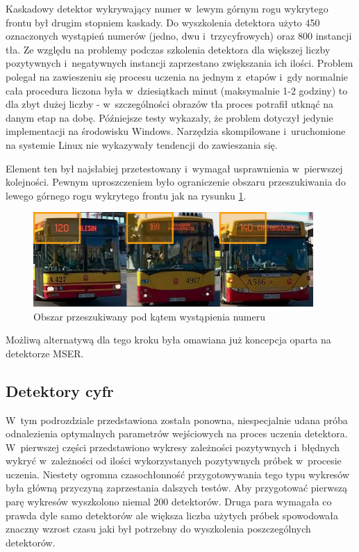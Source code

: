 Kaskadowy detektor wykrywający numer w~lewym górnym rogu wykrytego
frontu był drugim stopniem kaskady. Do wyszkolenia
detektora użyto 450 oznaczonych wystąpień numerów (jedno, dwu
i~trzycyfrowych) oraz 800 instancji tła. Ze względu na problemy podczas
szkolenia detektora dla większej liczby pozytywnych i~negatywnych 
instancji zaprzestano zwiększania ich ilości. Problem polegał na
zawieszeniu się procesu uczenia na jednym z~etapów i~gdy normalnie 
cała procedura liczona była w~dziesiątkach minut (maksymalnie 1-2 godziny)
to dla zbyt dużej liczby - w~szczególności obrazów tła proces potrafił
utknąć na danym etap na dobę. Późniejsze testy wykazały, że
problem dotyczył jedynie implementacji na środowisku Windows. 
Narzędzia skompilowane i~uruchomione na systemie Linux nie 
wykazywały tendencji do zawieszania się.

Element ten był najsłabiej przetestowany i~wymagał usprawnienia 
w~pierwszej kolejności. Pewnym uproszczeniem było
ograniczenie obszaru przeszukiwania do lewego górnego rogu wykrytego
frontu jak na rysunku \ref{fig:frontupperleft}.

\begin{figure}[!h]
    \centering
    \includegraphics[width=0.95\textwidth]{img/exp_front_upper_left}
    \caption{Obszar przeszukiwany pod kątem wystąpienia numeru}
    \label{fig:frontupperleft}
\end{figure}

Możliwą alternatywą dla tego kroku była omawiana już koncepcja
oparta na detektorze MSER.

\subsection{Detektory cyfr}

W~tym podrozdziale przedstawiona została ponowna,
niespecjalnie udana próba odnalezienia optymalnych
parametrów wejściowych na proces uczenia detektora.
W~pierwszej części przedstawiono wykresy zależności pozytywnych
i~błędnych wykryć w~zależności od ilości wykorzystanych
pozytywnych próbek w~procesie uczenia. Niestety
ogromna czasochłonność przygotowywania tego typu wykresów
była główną przyczyną zaprzestania dalszych testów.
Aby przygotować pierwszą parę wykresów wyszkolono niemal 200 detektorów.
Druga para wymagała co prawda dyle samo detektorów ale większa 
liczba użytych próbek spowodowała znaczny wzrost czasu jaki był 
potrzebny do wyszkolenia poszczególnych detektorów.

